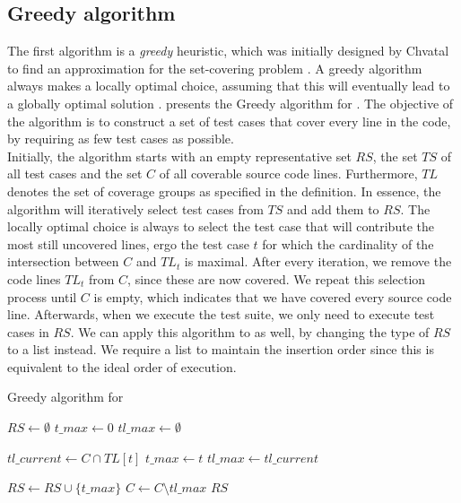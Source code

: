 
\subsection{Greedy algorithm}\label{ssec:alg-greedy}
The first algorithm is a \emph{greedy} heuristic, which was initially designed by Chvatal to find an approximation for the set-covering problem \cite{evaluationoftestsuiteminimization}. A greedy algorithm always makes a locally optimal choice, assuming that this will eventually lead to a globally optimal solution \cite{10.5555/1614191}.  presents the Greedy algorithm for \tsm{}. The objective of the algorithm is to construct a set of test cases that cover every line in the code, by requiring as few test cases as possible.\\

\noindent Initially, the algorithm starts with an empty representative set $RS$, the set $TS$ of all test cases and the set $C$ of all coverable source code lines. Furthermore, $TL$ denotes the set of coverage groups as specified in the definition. In essence, the algorithm will iteratively select test cases from $TS$ and add them to $RS$. The locally optimal choice is always to select the test case that will contribute the most still uncovered lines, ergo the test case $t$ for which the cardinality of the intersection between $C$ and $TL_t$ is maximal. After every iteration, we remove the code lines $TL_t$ from $C$, since these are now covered. We repeat this selection process until $C$ is empty, which indicates that we have covered every source code line. Afterwards, when we execute the test suite, we only need to execute test cases in $RS$. We can apply this algorithm to \tcp{} as well, by changing the type of $RS$ to a list instead. We require a list to maintain the insertion order since this is equivalent to the ideal order of execution.

\begin{algorithm}[h!]
\caption{Greedy algorithm for \tsm{}}
\label{alg:tsm-greedy}
\begin{algorithmic}[1]
		\State $RS \gets \emptyset$
			\State $t\_max \gets 0$
			\State $tl\_max \gets \emptyset$
			
				\State $tl\_current \gets C \cap TL[t]$
					\State $t\_max \gets t$
					\State $tl\_max \gets tl\_current$
				\EndIf
			\EndFor
			
			\State $RS \gets RS \cup \{t\_max\}$
			\State $C \gets C \setminus tl\_max$
		\EndWhile
		\State \Return $RS$
	\EndProcedure
\end{algorithmic}
\end{algorithm}
